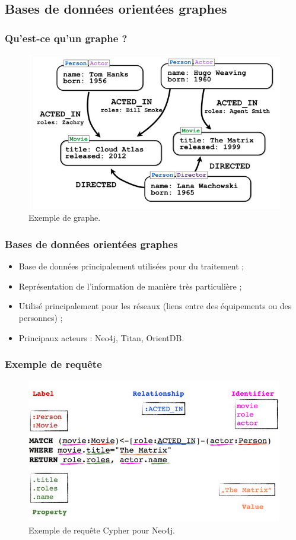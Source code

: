 	\subsection{Bases de données orientées graphes}
	\begin{frame}
		\frametitle{Qu'est-ce qu'un graphe ?}

		\begin{figure}[htb]
			\includegraphics[width=1\textwidth]{images/graphe.png}
			\caption{Exemple de graphe.}
		\end{figure}
	\end{frame}

	\begin{frame}
		\frametitle{Bases de données orientées graphes}

		\begin{itemize}
			\item Base de données principalement utilisées pour du traitement ;
			\item Représentation de l'information de manière très particulière ;
			\item Utilisé principalement pour les réseaux (liens entre des équipements ou des personnes) ;
			\item Principaux acteurs : Neo4j, Titan, OrientDB.
		\end{itemize}
	\end{frame}

	\begin{frame}
		\frametitle{Exemple de requête}

		\begin{figure}[htb]
			\includegraphics[width=1\textwidth]{images/requeteNeo4j.png}
			\caption{Exemple de requête Cypher pour Neo4j.}
		\end{figure}
	\end{frame}
